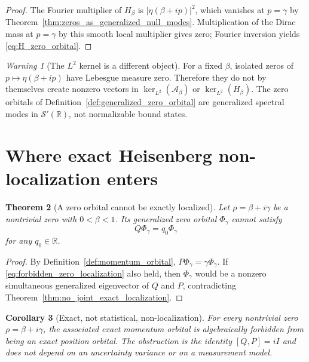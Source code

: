 \documentclass[11pt]{amsart}
\numberwithin{equation}{section}
\theoremstyle{plain}
\newtheorem{theorem}{Theorem}[section]
\newtheorem{corollary}[theorem]{Corollary}
\theoremstyle{definition}
\theoremstyle{remark}
\newtheorem{warning}[theorem]{Warning}
\newcommand{\R}{\mathbb{R}}
\newcommand{\Sch}{\mathcal{S}}
\begin{document}
\begin{proof}
The Fourier multiplier of $H_\beta$ is
$|\eta(\beta+ip)|^2$, which vanishes at $p=\gamma$ by
Theorem~\ref{thm:zeros_as_generalized_null_modes}.  Multiplication of the
Dirac mass at $p=\gamma$ by this smooth local multiplier gives zero; Fourier
inversion yields \eqref{eq:H_zero_orbital}.
\end{proof}

\begin{warning}[The $L^2$ kernel is a different object]
\label{warn:L2_kernel_not_zero_set}
For a fixed $\beta$, isolated zeros of $p\mapsto\eta(\beta+ip)$ have
Lebesgue measure zero.  Therefore they do not by themselves create nonzero
vectors in $\ker_{L^2}(\mathcal A_\beta)$ or
$\ker_{L^2}(H_\beta)$.  The zero orbitals of
Definition~\ref{def:generalized_zero_orbital} are generalized spectral
modes in $\Sch'(\R)$, not normalizable bound states.
\end{warning}

\section{Where exact Heisenberg non-localization enters}
\label{sec:heisenberg_zero_orbitals}

\begin{theorem}[A zero orbital cannot be exactly localized]
\label{thm:zero_orbital_nonlocalization}
Let $\rho=\beta+i\gamma$ be a nontrivial zero with $0<\beta<1$.  Its
generalized zero orbital $\Phi_\gamma$ cannot satisfy
\begin{equation}
Q\Phi_\gamma=q_0\Phi_\gamma
\label{eq:forbidden_zero_localization}
\end{equation}
for any $q_0\in\R$.
\end{theorem}

\begin{proof}
By Definition~\ref{def:momentum_orbital},
$P\Phi_\gamma=\gamma\Phi_\gamma$.  If
\eqref{eq:forbidden_zero_localization} also held, then
$\Phi_\gamma$ would be a nonzero simultaneous generalized eigenvector of
$Q$ and $P$, contradicting
Theorem~\ref{thm:no_joint_exact_localization}.
\end{proof}

\begin{corollary}[Exact, not statistical, non-localization]
\label{cor:exact_not_statistical}
For every nontrivial zero $\rho=\beta+i\gamma$, the associated exact
momentum orbital is algebraically forbidden from being an exact position
orbital.  The obstruction is the identity $[Q,P]=iI$ and does not depend on
an uncertainty variance or on a measurement model.
\end{corollary}
\end{document}
